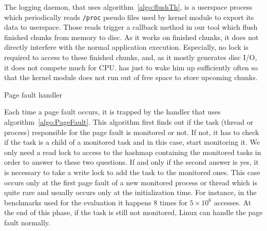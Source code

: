 The logging daemon, that uses algorithm~\ref{algo:flushTh}, is a userspace process
which periodically reads \texttt{/proc} pseudo files used by \Moca kernel module to export
its data to userspace. Those reads trigger a
callback method in our tool which flush finished chunks from memory to
disc. As it works on finished chunks, it does not directly interfere with the
normal application execution. Especially, no lock is required to access to these finished chunks,
and, as it mostly generates disc I/O, it does not compete much for CPU.
\Moca has just to wake him up sufficiently often so that the kernel module does not run out
of free space to store upcoming chunks.

\begin{algorithm}[htb]
    \caption{Page fault handler}
    \label{algo:PageFault}
    \begin{algorithmic}[1]
                    \State \Return {}
                \EndIf
            \EndIf
            \State {}
            \State {}
            \State {}
            \State {}
            \State {}
            \State {}
        \EndFunction
    \end{algorithmic}
\end{algorithm}

Each time a page fault occurs, it is trapped by the \Moca handler that uses
algorithm~\ref{algo:PageFault}. This algorithm first finds out if the task
(thread or process) responsible for the page fault is
monitored or not. If not, it has to check if the task is a child of a monitored
task and in this case, start monitoring it. We only need a read lock
to access to the hashmap containing the monitored tasks in order to answer to these
two questions.
If and only if the second answer is yes, it is necessary to take
a write lock to add the task to the monitored ones.
This case occurs only at the first page fault of a new monitored
process or thread which is quite rare and usually occurs only at the
initialization time. For instance, in the benchmarks used for
the evaluation it happens $8$ times for $5\times10^6$ accesses.
At the end of this phase, if the task is still not monitored, Linux can handle the page fault normally.

